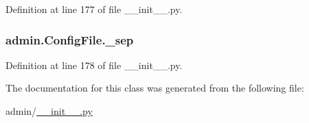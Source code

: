 Definition at line 177 of file \-\_\-\-\_\-init\-\_\-\-\_\-.\-py.

\hypertarget{classadmin_1_1ConfigFile_a3f7db562c59049e6a3b28b1fdfafa63e}{
\subsubsection[{\-\_\-sep}]{\setlength{\rightskip}{0pt plus 5cm}admin.\-Config\-File.\-\_\-sep\hspace{0.3cm}{\ttfamily [private]}}}\label{classadmin_1_1ConfigFile_a3f7db562c59049e6a3b28b1fdfafa63e}


Definition at line 178 of file \-\_\-\-\_\-init\-\_\-\-\_\-.\-py.



The documentation for this class was generated from the following file\-:\begin{DoxyCompactItemize}
\item 
admin/\hyperlink{____init_____8py}{\-\_\-\-\_\-init\-\_\-\-\_\-.\-py}\end{DoxyCompactItemize}
